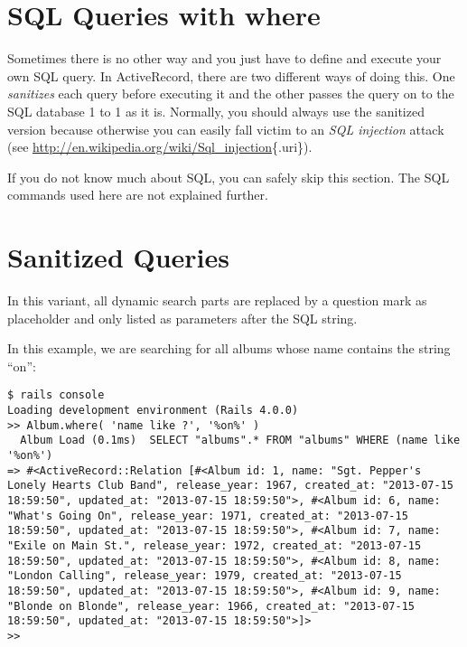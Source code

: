 \documentclass[a4paper]{book}
\newcounter{tab}[chapter]
\begin{document}
\section{SQL Queries with where}\label{sql-queries-with-where}

Sometimes there is no other way and you just have to define and execute your own SQL query. In ActiveRecord, there are two different ways of doing this. One \emph{sanitizes} each query before executing it and the other passes the query on to the SQL database 1 to 1 as it is. Normally, you should always use the sanitized version because otherwise you can easily fall victim to an \emph{SQL injection} attack (see \url{http://en.wikipedia.org/wiki/Sql_injection}\{.uri\}).

If you do not know much about SQL, you can safely skip this section. The SQL commands used here are not explained further.

\section{Sanitized Queries}\label{sanitized-queries}

In this variant, all dynamic search parts are replaced by a question mark as placeholder and only listed as parameters after the SQL string.

In this example, we are searching for all albums whose name contains the string “on”:

\begin{shaded}\begin{verbatim}
$ rails console
Loading development environment (Rails 4.0.0)
>> Album.where( 'name like ?', '%on%' )
  Album Load (0.1ms)  SELECT "albums".* FROM "albums" WHERE (name like '%on%')
=> #<ActiveRecord::Relation [#<Album id: 1, name: "Sgt. Pepper's Lonely Hearts Club Band", release_year: 1967, created_at: "2013-07-15 18:59:50", updated_at: "2013-07-15 18:59:50">, #<Album id: 6, name: "What's Going On", release_year: 1971, created_at: "2013-07-15 18:59:50", updated_at: "2013-07-15 18:59:50">, #<Album id: 7, name: "Exile on Main St.", release_year: 1972, created_at: "2013-07-15 18:59:50", updated_at: "2013-07-15 18:59:50">, #<Album id: 8, name: "London Calling", release_year: 1979, created_at: "2013-07-15 18:59:50", updated_at: "2013-07-15 18:59:50">, #<Album id: 9, name: "Blonde on Blonde", release_year: 1966, created_at: "2013-07-15 18:59:50", updated_at: "2013-07-15 18:59:50">]>
>>
\end{verbatim}\end{shaded}
\end{document}
